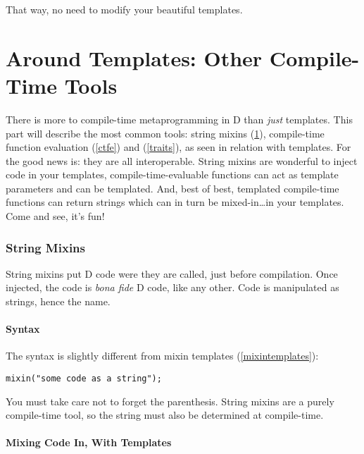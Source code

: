 That way, no need to modify your beautiful templates.



\newpage %
\part{Around Templates: Other Compile-Time Tools}\label{around}

There is more to compile-time metaprogramming in D than \emph{just} templates. This part will describe the most common tools: string mixins (\ref{stringmixins}), compile-time function evaluation (\ref{ctfe}) and  (\ref{traits}), as seen in relation with templates. For the good news is: they are all interoperable. String mixins are wonderful to inject code in your templates, compile-time-evaluable functions can act as template parameters and can be templated. And, best of best, templated compile-time functions can return strings which can in turn be mixed-in\ldots in your templates. Come and see, it's fun!

\section{String Mixins} \label{stringmixins}

String mixins put D code were they are called, just before compilation. Once injected, the code is \emph{bona fide} D code, like any other. Code is manipulated as strings, hence the name.

\subsection{Syntax}\label{stringmixinssyntax}

The syntax is slightly different from mixin templates (\ref{mixintemplates}):

\begin{verbatim}
mixin("some code as a string");
\end{verbatim}

You must take care not to forget the parenthesis. String mixins are a purely compile-time tool, so the string must also be determined at compile-time.

\subsection{Mixing Code In, With Templates}\label{stringmixinsandtemplates}


